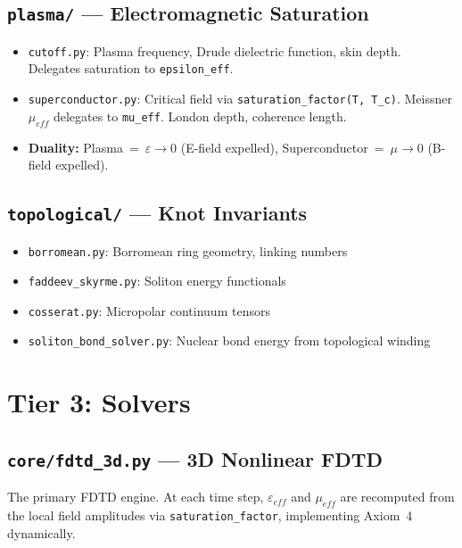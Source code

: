 \subsection{\texttt{plasma/} --- Electromagnetic Saturation}

\begin{itemize}
    \item \texttt{cutoff.py}: Plasma frequency, Drude dielectric function,
          skin depth. Delegates saturation to \texttt{epsilon\_eff}.
    \item \texttt{superconductor.py}: Critical field via
          \texttt{saturation\_factor(T, T\_c)}. Meissner $\mu_{eff}$
          delegates to \texttt{mu\_eff}. London depth, coherence length.
    \item \textbf{Duality:}
          Plasma~=~$\varepsilon\to 0$ (E-field expelled),
          Superconductor~=~$\mu\to 0$ (B-field expelled).
\end{itemize}

\subsection{\texttt{topological/} --- Knot Invariants}

\begin{itemize}
    \item \texttt{borromean.py}: Borromean ring geometry, linking numbers
    \item \texttt{faddeev\_skyrme.py}: Soliton energy functionals
    \item \texttt{cosserat.py}: Micropolar continuum tensors
    \item \texttt{soliton\_bond\_solver.py}: Nuclear bond energy from
          topological winding
\end{itemize}



\section{Tier 3: Solvers}
\label{sec:tier3_solvers}

\subsection{\texttt{core/fdtd\_3d.py} --- 3D Nonlinear FDTD}

The primary FDTD engine.  At each time step, $\varepsilon_{eff}$
and $\mu_{eff}$ are recomputed from the local field amplitudes via
\texttt{saturation\_factor}, implementing Axiom~4 dynamically.


